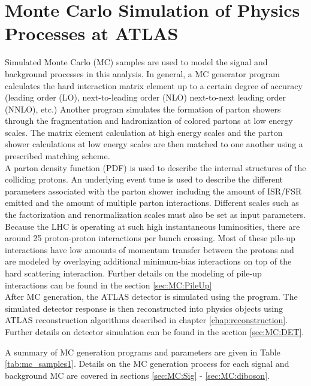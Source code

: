 \chapter{Monte Carlo Simulation of Physics Processes at ATLAS}
\label{chap:MCSimulation}

\indent Simulated Monte Carlo (MC) samples are used to model the signal and background processes in this analysis.  In general, a MC generator program calculates the hard interaction matrix element up to a certain degree of accuracy (leading order (LO), next-to-leading order (NLO) next-to-next leading order (NNLO), etc.)  Another program simulates the formation of parton showers through the fragmentation and hadronization of colored partons at low energy scales.  The matrix element calculation at high energy scales and the parton shower calculations at low energy scales are then matched to one another using a prescribed matching scheme.  \\

\indent A parton density function (PDF) is used to describe the internal structures of the colliding protons. An underlying event tune is used to describe the different parameters associated with the parton shower including the amount of ISR/FSR emitted and the amount of multiple parton interactions. Different scales such as the factorization and renormalization scales must also be set as input parameters.  \\

\indent  Because the LHC is operating at such high instantaneous luminosities, there are around 25 proton-proton interactions per bunch crossing.  Most of these pile-up interactions have low amounts of momentum transfer between the protons and are modeled by overlaying additional minimum-bias interactions on top of the hard scattering interaction.  Further details on the modeling of pile-up interactions can be found in the section \ref{sec:MC:PileUp}\\

\indent After MC generation, the ATLAS detector is simulated using the  program.\cite{Geant}  The simulated detector response is then reconstructed into physics objects using ATLAS reconstruction algorithms described in chapter \ref{chap:reconstruction}.  Further details on detector simulation can be found in the section \ref{sec:MC:DET}.

\indent A summary of MC generation programs and parameters are given in Table \ref{tab:mc_samples1}.  Details on the MC generation process for each signal and background MC are covered in sections \ref{sec:MC:Sig} - \ref{sec:MC:diboson}.  \\  %

